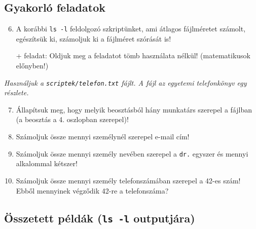 \subsection*{Gyakorló feladatok}
\begin{enumerate}
\setcounter{enumi}{5}
\item A korábbi \texttt{ls -l} feldolgozó szkriptünket, ami átlagos fájlméretet számolt, egészítsük ki,
	számoljuk ki a fájlméret szórását is!

	+ feladat: Oldjuk meg a feladatot tömb használata nélkül! (matematikusok előnyben!)
\end{enumerate}

\noindent \emph{Használjuk a \texttt{scriptek/telefon.txt} fájlt. A fájl az egyetemi telefonkönyv egy részlete. }

\begin{enumerate}
\setcounter{enumi}{6}
\item Állapítsuk meg, hogy melyik beosztásból hány munkatárs szerepel a fájlban (a beosztás a 4. oszlopban szerepel)!
\item Számoljuk össze mennyi személynél szerepel e-mail cím!
\item Számoljuk össze mennyi személy nevében szerepel a \texttt{dr.} egyszer és mennyi alkalommal kétszer!
\item Számoljuk össze mennyi személy telefonszámában szerepel a 42-es szám!
	Ebből mennyinek végződik 42-re a telefonszáma?
\end{enumerate}


	\subsection[Összetett példák]{Összetett példák (\texttt{ls -l} outputjára)}
    
    
    


